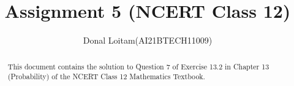 \documentclass[journal,12pt,twocolumn]{IEEEtran}
\begin{document}
\makeatother
\let\StandardTheFigure\thefigure
\let\vec\mathbf
\renewcommand{\thefigure}{\theproblem}
\def\putbox#1#2#3{\makebox[0in][l]{\makebox[#1][l]{}\raisebox{\baselineskip}[0in][0in]{\raisebox{#2}[0in][0in]{#3}}}}
     \def\rightbox#1{\makebox[0in][r]{#1}}
     \def\centbox#1{\makebox[0in]{#1}}
     \def\topbox#1{\raisebox{-\baselineskip}[0in][0in]{#1}}
     \def\midbox#1{\raisebox{-0.5\baselineskip}[0in][0in]{#1}}
\vspace{3cm}
\title{Assignment 5 (NCERT Class 12)}
\author{Donal Loitam(AI21BTECH11009)}	
\maketitle

\begin{abstract}
This document contains the solution to Question 7 of Exercise 13.2 in Chapter 13 (Probability) of the NCERT Class 12 Mathematics Textbook.
\end{abstract}
\end{document}
